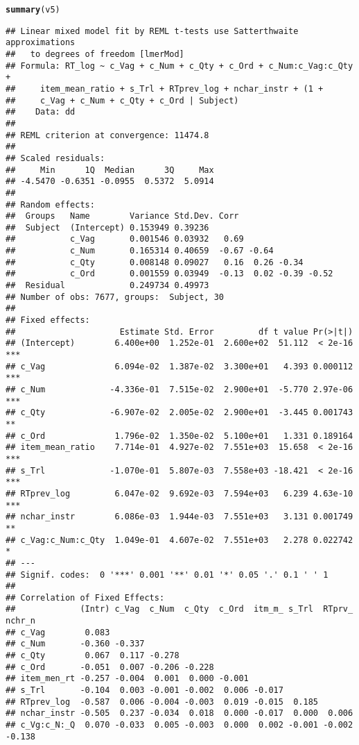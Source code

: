 \documentclass[a4paper]{article}\usepackage[]{graphicx}\usepackage[]{color}
\makeatletter
\newcommand{\hlstd}[1]{\textcolor[rgb]{0.345,0.345,0.345}{#1}}%
\newcommand{\hlkwd}[1]{\textcolor[rgb]{0.737,0.353,0.396}{\textbf{#1}}}%
\newenvironment{kframe}{%
 \def\at@end@of@kframe{}%
 \ifinner\ifhmode%
  \def\at@end@of@kframe{\end{minipage}}%
  \begin{minipage}{\columnwidth}%
 \fi\fi%
 \def\FrameCommand##1{\hskip\@totalleftmargin \hskip-\fboxsep
 \colorbox{shadecolor}{##1}\hskip-\fboxsep
     \hskip-\linewidth \hskip-\@totalleftmargin \hskip\columnwidth}%
 \MakeFramed {\advance\hsize-\width
   \@totalleftmargin\z@ \linewidth\hsize
   \@setminipage}}%
 {\par\unskip\endMakeFramed%
 \at@end@of@kframe}
\newenvironment{knitrout}{}{} %
\makeatother
\begin{document}
\begin{knitrout}
\color{fgcolor}\begin{kframe}
\begin{alltt}
\hlkwd{summary}\hlstd{(v5)}
\end{alltt}
\begin{verbatim}
## Linear mixed model fit by REML t-tests use Satterthwaite approximations
##   to degrees of freedom [lmerMod]
## Formula: RT_log ~ c_Vag + c_Num + c_Qty + c_Ord + c_Num:c_Vag:c_Qty +  
##     item_mean_ratio + s_Trl + RTprev_log + nchar_instr + (1 +  
##     c_Vag + c_Num + c_Qty + c_Ord | Subject)
##    Data: dd
## 
## REML criterion at convergence: 11474.8
## 
## Scaled residuals: 
##     Min      1Q  Median      3Q     Max 
## -4.5470 -0.6351 -0.0955  0.5372  5.0914 
## 
## Random effects:
##  Groups   Name        Variance Std.Dev. Corr                   
##  Subject  (Intercept) 0.153949 0.39236                         
##           c_Vag       0.001546 0.03932   0.69                  
##           c_Num       0.165314 0.40659  -0.67 -0.64            
##           c_Qty       0.008148 0.09027   0.16  0.26 -0.34      
##           c_Ord       0.001559 0.03949  -0.13  0.02 -0.39 -0.52
##  Residual             0.249734 0.49973                         
## Number of obs: 7677, groups:  Subject, 30
## 
## Fixed effects:
##                     Estimate Std. Error         df t value Pr(>|t|)    
## (Intercept)        6.400e+00  1.252e-01  2.600e+02  51.112  < 2e-16 ***
## c_Vag              6.094e-02  1.387e-02  3.300e+01   4.393 0.000112 ***
## c_Num             -4.336e-01  7.515e-02  2.900e+01  -5.770 2.97e-06 ***
## c_Qty             -6.907e-02  2.005e-02  2.900e+01  -3.445 0.001743 ** 
## c_Ord              1.796e-02  1.350e-02  5.100e+01   1.331 0.189164    
## item_mean_ratio    7.714e-01  4.927e-02  7.551e+03  15.658  < 2e-16 ***
## s_Trl             -1.070e-01  5.807e-03  7.558e+03 -18.421  < 2e-16 ***
## RTprev_log         6.047e-02  9.692e-03  7.594e+03   6.239 4.63e-10 ***
## nchar_instr        6.086e-03  1.944e-03  7.551e+03   3.131 0.001749 ** 
## c_Vag:c_Num:c_Qty  1.049e-01  4.607e-02  7.551e+03   2.278 0.022742 *  
## ---
## Signif. codes:  0 '***' 0.001 '**' 0.01 '*' 0.05 '.' 0.1 ' ' 1
## 
## Correlation of Fixed Effects:
##             (Intr) c_Vag  c_Num  c_Qty  c_Ord  itm_m_ s_Trl  RTprv_ nchr_n
## c_Vag        0.083                                                        
## c_Num       -0.360 -0.337                                                 
## c_Qty        0.067  0.117 -0.278                                          
## c_Ord       -0.051  0.007 -0.206 -0.228                                   
## item_men_rt -0.257 -0.004  0.001  0.000 -0.001                            
## s_Trl       -0.104  0.003 -0.001 -0.002  0.006 -0.017                     
## RTprev_log  -0.587  0.006 -0.004 -0.003  0.019 -0.015  0.185              
## nchar_instr -0.505  0.237 -0.034  0.018  0.000 -0.017  0.000  0.006       
## c_Vg:c_N:_Q  0.070 -0.033  0.005 -0.003  0.000  0.002 -0.001 -0.002 -0.138
\end{verbatim}
\end{kframe}
\end{knitrout}
\end{document}

